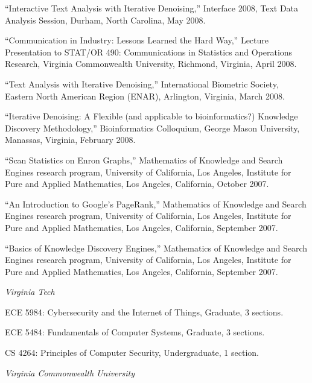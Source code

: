 \documentclass[11pt,article,oneside]{memoir}
\begin{document}
\ind “Interactive Text Analysis with Iterative Denoising,” Interface 2008, Text Data Analysis Session, Durham, North Carolina, May 2008.

\ind “Communication in Industry: Lessons Learned the Hard Way,” Lecture Presentation to STAT/OR 490: Communications in Statistics and Operations Research, Virginia Commonwealth University, Richmond, Virginia, April 2008.

\ind “Text Analysis with Iterative Denoising,” International Biometric Society, Eastern North American Region (ENAR), Arlington, Virginia, March 2008.

\ind “Iterative Denoising: A Flexible (and applicable to bioinformatics?) Knowledge Discovery Methodology,” Bioinformatics Colloquium, George Mason University, Manassas, Virginia, February 2008.

\ind “Scan Statistics on Enron Graphs,” Mathematics of Knowledge and Search Engines research program, University of California, Los Angeles, Institute for Pure and Applied Mathematics, Los Angeles, California, October 2007.

\ind “An Introduction to Google’s PageRank,” Mathematics of Knowledge and Search Engines research program, University of California, Los Angeles, Institute for Pure and Applied Mathematics, Los Angeles, California, September 2007.

\ind “Basics of Knowledge Discovery Engines,” Mathematics of Knowledge and Search Engines research program, University of California, Los Angeles, Institute for Pure and Applied Mathematics, Los Angeles, California, September 2007.


 


\bigskip


\noindent\emph{Virginia Tech \vspace{0.05in}}

\ind ECE 5984: Cybersecurity and the Internet of Things, Graduate, 3 sections.

\ind ECE 5484: Fundamentals of Computer Systems, Graduate, 3 sections.

\ind CS 4264: Principles of Computer Security, Undergraduate, 1 section.

\newpage

\noindent\emph{Virginia Commonwealth University \vspace{0.05in}}
\end{document}
